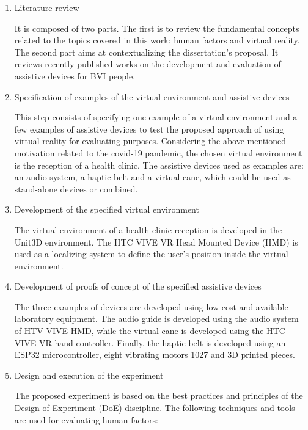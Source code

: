 \begin{enumerate}[leftmargin = 6em, label = Step \arabic* -- ]
    \item Literature review 
    
    It is composed of two parts. The first is to review the fundamental concepts related to the topics covered in this work: human factors and virtual reality. The second part aims at contextualizing the dissertation’s proposal. It reviews recently published works on the development and evaluation of assistive devices for BVI people.
    
    \item Specification of examples of the virtual environment and assistive devices

    This step consists of specifying one example of a virtual environment and a few examples of assistive devices to test the proposed approach of using virtual reality for evaluating purposes. Considering the above-mentioned motivation related to the covid-19 pandemic, the chosen virtual environment is the reception of a health clinic. The assistive devices used as examples are: an audio system, a haptic belt and a virtual cane, which could be used as stand-alone devices or combined.
    
    \item Development of the specified virtual environment
    
    The virtual environment of a health clinic reception is developed in the Unit3D environment. The HTC VIVE VR Head Mounted Device (HMD) is used as a localizing system to define the user's position inside the virtual environment.
    
    \item Development of proofs of concept of the specified assistive devices
    
    The three examples of devices are developed using low-cost and available laboratory equipment. The audio guide is developed using the audio system of HTV VIVE HMD, while the virtual cane is developed using the HTC VIVE VR hand controller. Finally, the haptic belt is developed using an ESP32 microcontroller, eight vibrating motors 1027 and 3D printed pieces.
    
    \item Design and execution of the experiment
    
    The proposed experiment is based on the best practices and principles of the Design of Experiment (DoE) discipline.
    The following techniques and tools are used for evaluating human factors:


\end{enumerate}
